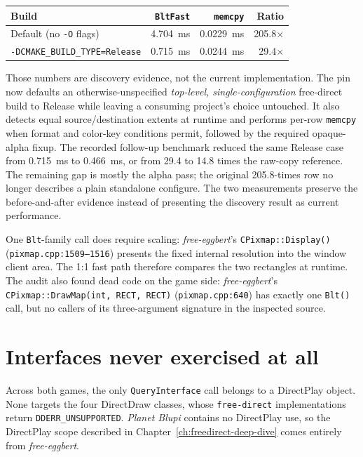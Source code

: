 \begin{center}
\small
\begin{tabular}{lrrr}
\toprule
\textbf{Build} & \textbf{\texttt{BltFast}} & \textbf{\texttt{memcpy}} & \textbf{Ratio} \\
\midrule
Default (no \texttt{-O} flags) & 4.704~ms & 0.0229~ms & 205.8$\times$ \\
\texttt{-DCMAKE\_BUILD\_TYPE=Release} & 0.715~ms & 0.0244~ms & 29.4$\times$ \\
\bottomrule
\end{tabular}
\end{center}

Those numbers are discovery evidence, not the current implementation. The pin now defaults an
otherwise-unspecified \emph{top-level, single-configuration} free-direct build to Release while
leaving a consuming project's choice untouched. It also detects equal source/destination extents
at runtime and performs per-row \texttt{memcpy} when format and color-key conditions permit,
followed by the required opaque-alpha fixup. The recorded follow-up benchmark reduced the same
Release case from 0.715~ms to 0.466~ms, or from 29.4 to 14.8 times the raw-copy reference. The
remaining gap is mostly the alpha pass; the original 205.8-times row no longer describes a plain
standalone configure. The two measurements preserve the before-and-after evidence instead of
presenting the discovery result as current performance.

One \texttt{Blt}-family call does require scaling: \emph{free-eggbert}'s
\texttt{CPixmap::Display()} (\texttt{pixmap.cpp:1509--1516}) presents the fixed internal
resolution into the window client area. The 1:1 fast path therefore compares the two rectangles
at runtime. The audit also found dead code on the game side: \emph{free-eggbert}'s
\texttt{CPixmap::DrawMap(int, RECT, RECT)} (\texttt{pixmap.cpp:640}) has exactly one
\texttt{Blt()} call, but no callers of its three-argument signature in the inspected source.

\section{Interfaces never exercised at all}

Across both games, the only \texttt{QueryInterface} call belongs to a DirectPlay object. None
targets the four DirectDraw classes, whose \texttt{free-direct} implementations return
\texttt{DDERR\_UNSUPPORTED}. \emph{Planet Blupi} contains no DirectPlay use, so the DirectPlay
scope described in Chapter~\ref{ch:freedirect-deep-dive} comes entirely from
\emph{free-eggbert}.

